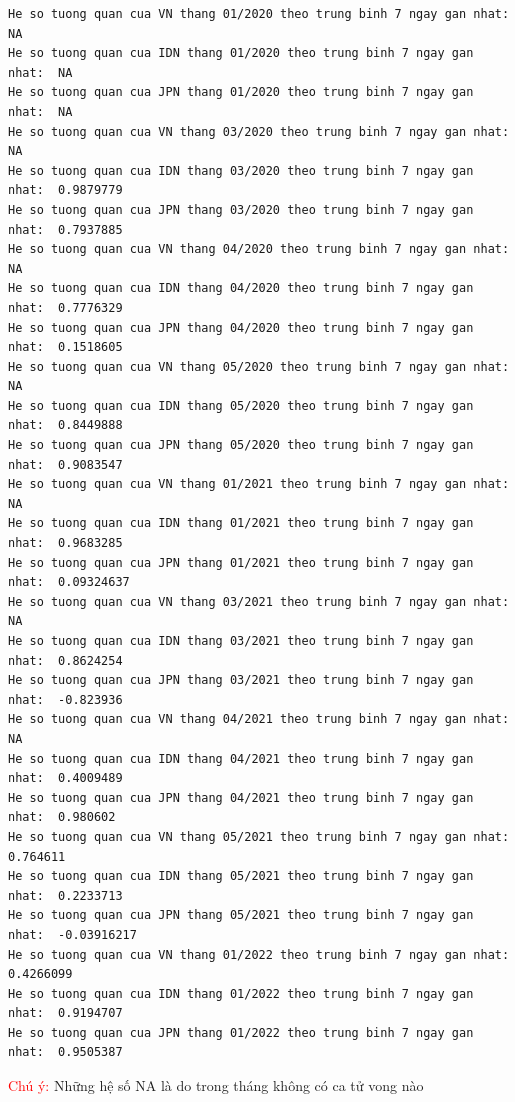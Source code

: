 \documentclass[a4paper]{article}
\theoremstyle{definition}
\begin{document}
\begin{enumerate}[1)]
\begin{lstlisting}
He so tuong quan cua VN thang 01/2020 theo trung binh 7 ngay gan nhat:  NA 
He so tuong quan cua IDN thang 01/2020 theo trung binh 7 ngay gan nhat:  NA 
He so tuong quan cua JPN thang 01/2020 theo trung binh 7 ngay gan nhat:  NA 
He so tuong quan cua VN thang 03/2020 theo trung binh 7 ngay gan nhat:  NA 
He so tuong quan cua IDN thang 03/2020 theo trung binh 7 ngay gan nhat:  0.9879779 
He so tuong quan cua JPN thang 03/2020 theo trung binh 7 ngay gan nhat:  0.7937885 
He so tuong quan cua VN thang 04/2020 theo trung binh 7 ngay gan nhat:  NA 
He so tuong quan cua IDN thang 04/2020 theo trung binh 7 ngay gan nhat:  0.7776329 
He so tuong quan cua JPN thang 04/2020 theo trung binh 7 ngay gan nhat:  0.1518605 
He so tuong quan cua VN thang 05/2020 theo trung binh 7 ngay gan nhat:  NA 
He so tuong quan cua IDN thang 05/2020 theo trung binh 7 ngay gan nhat:  0.8449888 
He so tuong quan cua JPN thang 05/2020 theo trung binh 7 ngay gan nhat:  0.9083547 
He so tuong quan cua VN thang 01/2021 theo trung binh 7 ngay gan nhat:  NA 
He so tuong quan cua IDN thang 01/2021 theo trung binh 7 ngay gan nhat:  0.9683285 
He so tuong quan cua JPN thang 01/2021 theo trung binh 7 ngay gan nhat:  0.09324637 
He so tuong quan cua VN thang 03/2021 theo trung binh 7 ngay gan nhat:  NA 
He so tuong quan cua IDN thang 03/2021 theo trung binh 7 ngay gan nhat:  0.8624254 
He so tuong quan cua JPN thang 03/2021 theo trung binh 7 ngay gan nhat:  -0.823936 
He so tuong quan cua VN thang 04/2021 theo trung binh 7 ngay gan nhat:  NA 
He so tuong quan cua IDN thang 04/2021 theo trung binh 7 ngay gan nhat:  0.4009489 
He so tuong quan cua JPN thang 04/2021 theo trung binh 7 ngay gan nhat:  0.980602 
He so tuong quan cua VN thang 05/2021 theo trung binh 7 ngay gan nhat:  0.764611 
He so tuong quan cua IDN thang 05/2021 theo trung binh 7 ngay gan nhat:  0.2233713 
He so tuong quan cua JPN thang 05/2021 theo trung binh 7 ngay gan nhat:  -0.03916217 
He so tuong quan cua VN thang 01/2022 theo trung binh 7 ngay gan nhat:  0.4266099 
He so tuong quan cua IDN thang 01/2022 theo trung binh 7 ngay gan nhat:  0.9194707 
He so tuong quan cua JPN thang 01/2022 theo trung binh 7 ngay gan nhat:  0.9505387 
\end{lstlisting}
\textcolor{red}{Chú ý: } Những hệ số NA là do trong tháng không có ca tử vong nào 

\end{enumerate}
    
    
    
    
    
\end{document}
